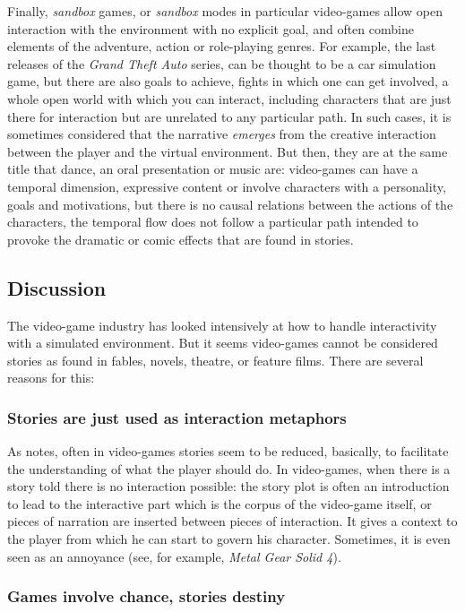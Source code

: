 \documentclass[
		twoside,openright,titlepage,numbers=noenddot,manychapters,
		headinclude,%
                footinclude=false,cleardoublepage=empty,
                BCOR=5mm,
		fontsize=11pt, %
                 enabledeprecatedfontcommands]{scrreprt}
\begin{document}
Finally, \emph{sandbox} games, or \emph{sandbox} modes in particular video-games allow open interaction with the environment with no explicit goal, and often combine elements of the adventure, action or role-playing genres.
 For example, the last releases of the \emph{Grand Theft Auto} series, can be thought to be a car simulation game, but there are also goals to achieve, fights in which one can get involved, a whole open world with which you can interact, including characters that are just there for interaction but are unrelated to any particular path. In such cases, it is sometimes considered that the narrative \emph{emerges} from the creative interaction between the player and the virtual environment. But then, they are at the same title that dance, an oral presentation or music are: video-games can have a temporal dimension, expressive content or involve characters with a personality, goals and motivations, but there is no causal relations between the actions of the characters, the temporal flow does not follow a particular path intended to provoke the dramatic or comic effects that are found in stories.


\subsection{Discussion}
  The video-game industry has looked intensively at how to handle interactivity with a simulated environment.  But it seems video-games cannot be considered stories as found in fables, novels, theatre, or feature films. There are several reasons for this:

\subsubsection{Stories are just used as interaction metaphors} 

As \cite{pearce2002story} notes, often in video-games stories seem to be reduced, basically, to facilitate the understanding of what the player should do. In video-games, when there is a story told there is no interaction possible: the story plot is often an introduction to lead to the interactive part which is the corpus of the video-game itself, or pieces of narration are inserted between pieces of interaction. It gives a context to the player from which he can start to govern his character. Sometimes, it is even seen as an annoyance (see, for example, \emph{Metal Gear Solid 4}).


\subsubsection{Games involve chance, stories destiny}
\end{document}
